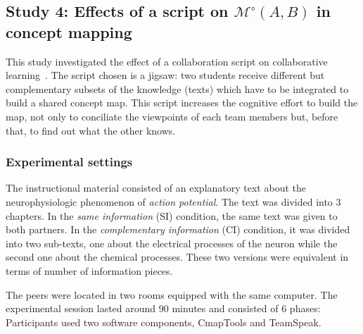 \documentclass[natbib]{svjour3}
\newcommand{\gModel}[2]{{$\mathcal{M}^{\circ}(#1, #2)$}}
\begin{document}
\subsection{{\bf Study 4}:  Effects of a script on \gModel{A}{B}  in concept mapping}

This study investigated the effect of a collaboration script on collaborative
learning~\citep{molinari2008effects}. The script chosen is a
{\sc jigsaw}: two students receive different but complementary subsets of the
knowledge (texts) which have to be integrated to build a shared concept map.
This script increases the cognitive effort to build the map, not only to
conciliate the viewpoints of each team members but, before that, to find out
what the other knows. 

\subsubsection*{Experimental settings}

The instructional material consisted of an explanatory text about the
neurophysiologic phenomenon of \emph{action potential}. The text was divided
into 3 chapters.  In the \emph{same information} (SI) condition, the same text
was given to both partners. In the \emph{complementary information} (CI)
condition, it was divided into two sub-texts, one about the electrical processes
of the neuron while the second one about the chemical processes. These two
versions were equivalent in terms of number of information pieces. 

The peers were located in two rooms equipped with the same
computer.  The experimental session lasted around 90 minutes and consisted of 6
phases: Participants used two software components, {\sc CmapTools} and {\sc
TeamSpeak}.
\end{document}
